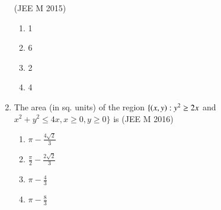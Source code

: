 \documentclass[journal,12pt,twocolumn]{IEEEtran}
\theoremstyle{remark}
\begin{document}
\begin{enumerate}[label=\textcolor{black}{\arabic*.}]
		\hfill{(JEE M 2015)}

		\begin{multicols}{4}
			\begin{enumerate}[label=(\alph*)]
				\item 1
				\item 6
				\item 2
				\item 4
			\end{enumerate}
		\end{multicols}


	\item The area (in sq. units) of the region $\{\left(x,y\right):y^2\geq2x$ and $x^2+y^2\leq4x, x\geq0, y\geq0\}$ is
		\hfill{(JEE M 2016)}

		\begin{multicols}{2}
			\begin{enumerate}[label=(\alph*)]
				\item $\pi-\frac{4\sqrt{2}}{3}$
				\item $\frac{\pi}{2}-\frac{2\sqrt{2}}{3}$
				\item $\pi-\frac{4}{3}$
				\item $\pi-\frac{8}{3}$ 
			\end{enumerate}
		\end{multicols} 
\end{enumerate}
\end{document}
